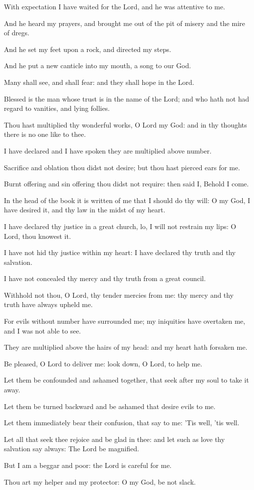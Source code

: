 ﻿\item With expectation I have waited for the Lord, and he was attentive to me.
\item And he heard my prayers, and brought me out of the pit of misery and the mire of dregs.
\item And he set my feet upon a rock, and directed my steps.
\item And he put a new canticle into my mouth, a song to our God.
\item Many shall see, and shall fear: and they shall hope in the Lord.
\item Blessed is the man whose trust is in the name of the Lord; and who hath not had regard to vanities, and lying follies.
\item Thou hast multiplied thy wonderful works, O Lord my God: and in thy thoughts there is no one like to thee.
\item I have declared and I have spoken they are multiplied above number.
\item Sacrifice and oblation thou didst not desire; but thou hast pierced ears for me.\ifx\enlinebreakafternine\undefined\else\\\fi
\item Burnt offering and sin offering thou didst not require: then said I, Behold I come.
\item In the head of the book it is written of me that I should do thy will: O my God, I have desired it, and thy law in the midst of my heart.
\item I have declared thy justice in a great church, lo, I will not restrain my lips: O Lord, thou knowest it.
\item I have not hid thy justice within my heart: I have declared thy truth and thy salvation.
\item I have not concealed thy mercy and thy truth from a great council.
\item Withhold not thou, O Lord, thy tender mercies from me: thy mercy and thy truth have always upheld me.
\item For evils without number have surrounded me; my iniquities have overtaken me, and I was not able to see.
\item They are multiplied above the hairs of my head: and my heart hath forsaken me.
\item Be pleased, O Lord to deliver me: look down, O Lord, to help me.
\item Let them be confounded and ashamed together, that seek after my soul to take it away.
\item Let them be turned backward and be ashamed that desire evils to me.
\item Let them immediately bear their confusion, that say to me: 'Tis well, 'tis well.
\item Let all that seek thee rejoice and be glad in thee: and let such as love thy salvation say always: The Lord be magnified.
\item But I am a beggar and poor: the Lord is careful for me.
\item Thou art my helper and my protector: O my God, be not slack.
